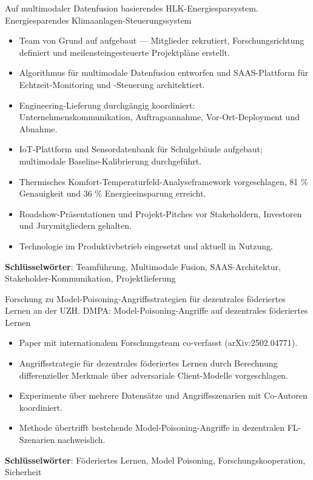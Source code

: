 \documentclass[a4paper, serif, 10pt]{moderncv}
\begin{document}
        {Auf multimodaler Datenfusion basierendes HLK-Energiesparsystem.}
        {Energiesparendes Klimaanlagen-Steuerungssystem}
        {}
        {}
        {\begin{itemize}
\item Team von Grund auf aufgebaut — Mitglieder rekrutiert, Forschungsrichtung definiert und meilensteingesteuerte Projektpläne erstellt.
\item Algorithmus für multimodale Datenfusion entworfen und SAAS-Plattform für Echtzeit-Monitoring und -Steuerung architektiert.
\item Engineering-Lieferung durchgängig koordiniert: Unternehmenskommunikation, Auftragsannahme, Vor-Ort-Deployment und Abnahme.
\item IoT-Plattform und Sensordatenbank für Schulgebäude aufgebaut; multimodale Baseline-Kalibrierung durchgeführt.
\item Thermisches Komfort-Temperaturfeld-Analyseframework vorgeschlagen, 81 \% Genauigkeit und 36 \% Energieeinsparung erreicht.
\item Roadshow-Präsentationen und Projekt-Pitches vor Stakeholdern, Investoren und Jurymitgliedern gehalten.
\item Technologie im Produktivbetrieb eingesetzt und aktuell in Nutzung.
\end{itemize}
\textbf{Schlüsselwörter}: Teamführung, Multimodale Fusion, SAAS-Architektur, Stakeholder-Kommunikation, Projektlieferung}

        {Forschung zu Model-Poisoning-Angriffsstrategien für dezentrales föderiertes Lernen an der UZH.}
        {DMPA: Model-Poisoning-Angriffe auf dezentrales föderiertes Lernen}
        {}
        {}
        {\begin{itemize}
\item Paper mit internationalem Forschungsteam co-verfasst (arXiv:2502.04771).
\item Angriffsstrategie für dezentrales föderiertes Lernen durch Berechnung differenzieller Merkmale über adversariale Client-Modelle vorgeschlagen.
\item Experimente über mehrere Datensätze und Angriffsszenarien mit Co-Autoren koordiniert.
\item Methode übertrifft bestehende Model-Poisoning-Angriffe in dezentralen FL-Szenarien nachweislich.
\end{itemize}
\textbf{Schlüsselwörter}: Föderiertes Lernen, Model Poisoning, Forschungskooperation, Sicherheit}
\end{document}
